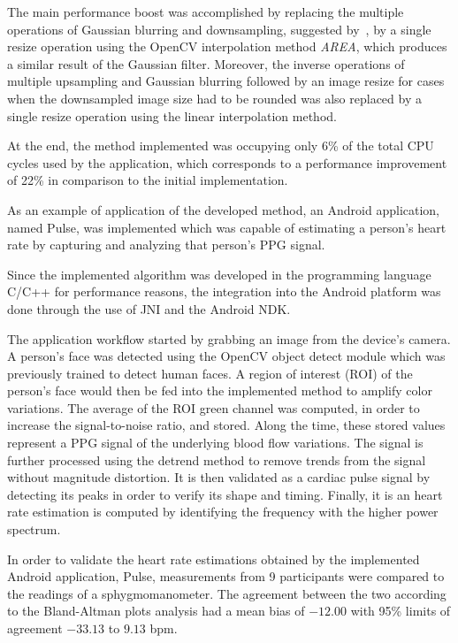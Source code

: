 The main performance boost was accomplished by replacing the multiple
operations of Gaussian blurring and downsampling, suggested
by~\cite{Wu2012Eulerian}, by a single resize operation using the OpenCV
interpolation method \emph{AREA}, which produces a similar result of the
Gaussian filter. Moreover, the inverse operations of multiple
upsampling and Gaussian blurring followed by an image resize
for cases when the downsampled image size had to be rounded was also
replaced by a single resize operation using the linear interpolation method.

At the end, the \evm{} method implemented was occupying only 6\% of the total
CPU cycles used by the application, which corresponds to a performance
improvement of 22\% in comparison to the initial implementation.

As an example of application of the developed \evm{} method, an Android
application, named Pulse, was implemented which was capable of estimating a
person's heart rate by capturing and analyzing that person's PPG signal.

Since the implemented algorithm was developed in the programming language
C/C++ for performance reasons, the integration into the Android platform
was done through the use of JNI and the Android NDK.

The application workflow started by grabbing an image from the device's
camera. A person's face was detected using the OpenCV object detect module
which was previously trained to detect human faces. A region of interest (ROI)
of the person's face would then be fed into the implemented \evm{} method to
amplify color variations. The average of the ROI green channel was computed,
in order to increase the signal-to-noise ratio, and stored. Along the time,
these stored values represent a PPG signal of the underlying blood flow
variations. The signal is further processed using the detrend method
to remove trends from the signal without magnitude distortion. It is then
validated as a cardiac pulse signal by detecting its peaks in order to
verify its shape and timing. Finally, it is an heart rate estimation is
computed by identifying the frequency with the higher power spectrum.

In order to validate the heart rate estimations obtained by the implemented
Android application, Pulse, measurements from 9 participants were compared
to the readings of a sphygmomanometer. The agreement between the two
according to the Bland-Altman plots analysis had a mean bias of $-12.00$ with
95\% limits of agreement $-33.13$ to $9.13$ bpm.

